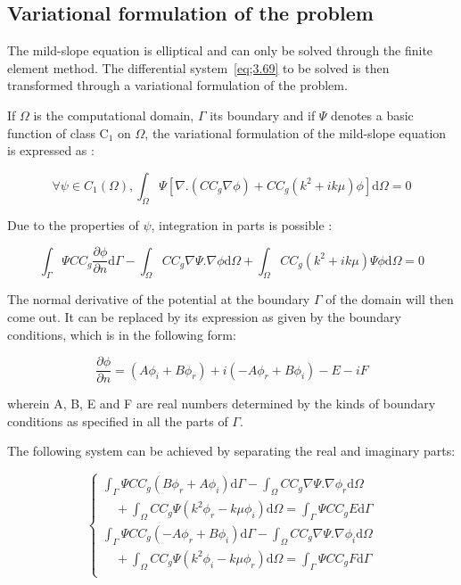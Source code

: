\subsection{Variational formulation of the problem}

The mild-slope equation is elliptical and can only be solved through the finite
element method. The differential system~\ref{eq;3.69} to be solved is
then transformed through a variational formulation of the problem.

If $\Omega$ is the computational domain, $\Gamma$ its boundary and if
$\Psi$ denotes a basic function of class C${}_{1}$ on $\Omega$, the variational
formulation of the mild-slope equation is expressed as :

\begin{equation}
  \forall \psi \in C_1(\Omega), \int_{\Omega}\Psi[\nabla.(CC_g\nabla\phi)+CC_g(k^2+ik\mu)\phi]\text{d}\Omega = 0
  \label{eq:3.70}
\end{equation}

Due to the properties of $\psi$, integration in parts is possible :

\begin{equation}
  \int_{\Gamma}\Psi CC_g \frac{\partial \phi}{\partial n}\text{d}\Gamma - \int_{\Omega}CC_g\nabla\Psi.\nabla\phi \text{d}\Omega+\int_{\Omega}CC_g(k^2+ik\mu)\Psi\phi \text{d}\Omega = 0
  \label{eq:3.71}
\end{equation}

The normal derivative of the potential at the boundary $\Gamma$ of the domain
will then come out. It can be replaced by its expression as given by the
boundary conditions, which is in the following form:

\begin{equation}
  \frac{\partial \phi}{\partial n} = (A\phi_i + B\phi_r) + i(-A\phi_r+B\phi_i) -E -iF
  \label{eq:3.72}
\end{equation}

wherein A, B, E and F are real numbers determined by the kinds of boundary
conditions as specified in all the parts of $\Gamma$.

The following system can be achieved by separating the real and imaginary parts:

\begin{equation}
  \left\{
    \begin{matrix}
      \int_{\Gamma}\Psi CC_g(B\phi_r + A\phi_i)\text{d}\Gamma -\int_{\Omega}CC_g\nabla\Psi.\nabla\phi_r \text{d}\Omega \\
      \quad +\int_\Omega CC_g\Psi(k^2\phi_r -k\mu\phi_i)\text{d}\Omega = \int_\Gamma\Psi CC_g E \text{d}\Gamma \\

      \int_{\Gamma}\Psi CC_g(-A\phi_r + B\phi_i)\text{d}\Gamma -\int_{\Omega}CC_g\nabla\Psi.\nabla\phi_i \text{d}\Omega \\
      \quad +\int_\Omega CC_g\Psi(k^2\phi_i -k\mu\phi_r)\text{d}\Omega = \int_\Gamma\Psi CC_g F \text{d}\Gamma \\
    \end{matrix}
    \right.
  \label{eq:3.73}
\end{equation}


